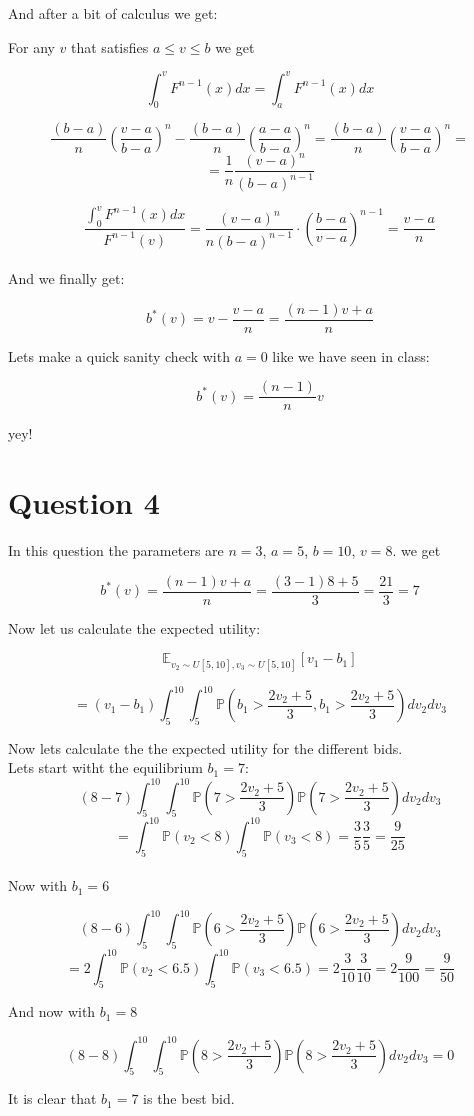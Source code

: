 \documentclass{article}
\begin{document}
And after a bit of calculus we get:

For any $v$ that satisfies $a\leq v \leq b$ we get

$$ \int_0^v F^{n-1}(x)dx=\int_a^v F^{n-1}(x)dx$$



$$
\frac{(b-a)}{n}(\frac{v-a}{b-a})^{n}-\frac{(b-a)}{n}(\frac{a-a}{b-a})^{n} =
\frac{(b-a)}{n}(\frac{v-a}{b-a})^{n} = $$
$$
=\frac{1}{n}\frac{(v-a)^n}{(b-a)^{n-1}}
$$

$$
\frac{\int_0^v
F^{n-1}(x)dx}{F^{n-1}(v)}=\frac{(v-a)^{n}}{n(b-a)^{n-1}} \cdot
(\frac{b-a}{v-a})^{n-1} = \frac{v-a}{n}$$
\\

And we finally get:

$$b^*(v) = v-\frac{v-a}{n}=\frac{(n-1)v+a}{n}$$

Lets make a quick sanity check with $a=0$ like we have seen in class:

$$b^*(v) =\frac{(n-1)}{n}v
$$

yey!


\section*{Question 4}
In this question the parameters are $n=3$, $a=5$, $b=10$, $v=8$. we get 

$$b^*(v) =\frac{(n-1)v+a}{n}=\frac{(3-1)8+5}{3}=\frac{21}{3}=7$$

Now let us calculate the expected utility:

$$ \mathbb{E}_{v_2 \sim U[5,10],v_3 \sim U[5,10]} \left[ v_1-b_1 \right]$$

$$ = (v_1-b_1)\int_{5}^{10}\int_{5}^{10}
\mathds{P}(b_1>\frac{2 v_2 + 5}{3},b_1>\frac{2 v_2 + 5}{3})dv_2 dv_3$$

Now lets calculate the the expected utility for the different bids. 
\\
Lets start witht the equilibrium $b_1=7$:
$$  (8-7)\int_{5}^{10}\int_{5}^{10}
\mathds{P}(7>\frac{2 v_2 + 5}{3})\mathds{P}(7>\frac{2 v_2 + 5}{3})dv_2 dv_3$$
$$
=\int_{5}^{10}\mathds{P}(v_2<8)\int_{5}^{10}\mathds{P}(v_3<8)
=\frac{3}{5}\frac{3}{5} = \frac{9}{25} $$
\\
Now with $b_1=6$

$$  (8-6)\int_{5}^{10}\int_{5}^{10}
\mathds{P}(6>\frac{2 v_2 + 5}{3})\mathds{P}(6>\frac{2 v_2 + 5}{3})dv_2 dv_3$$
$$
=2\int_{5}^{10}\mathds{P}(v_2<6.5)\int_{5}^{10}\mathds{P}(v_3<6.5)
=2\frac{3}{10}\frac{3}{10} = 2 \frac{9}{100} = \frac{9}{50} $$

And now with $b_1 = 8$

$$  (8-8)\int_{5}^{10}\int_{5}^{10}
\mathds{P}(8>\frac{2 v_2 + 5}{3})\mathds{P}(8>\frac{2 v_2 + 5}{3})dv_2 dv_3 =0$$

It is clear that $b_1=7$ is the best bid.
\end{document}
